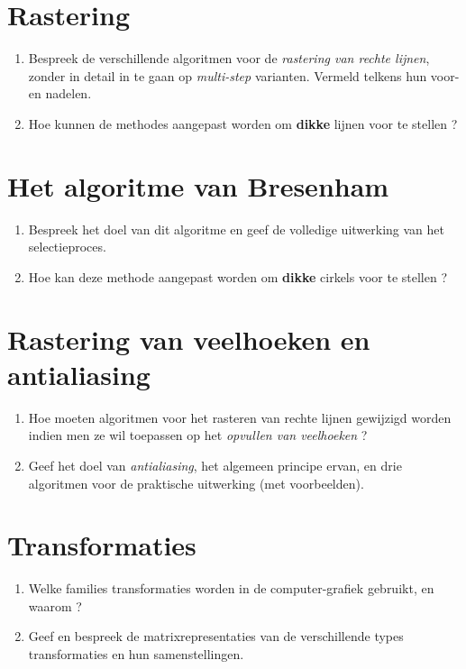 \documentclass{report}
\begin{document}
	\section{Rastering}
	\begin{enumerate}
		\item Bespreek de verschillende algoritmen voor de \textit{rastering van rechte lijnen}, zonder in detail in te gaan op \textit{multi-step} varianten. Vermeld telkens hun voor- en nadelen. 
		
		\item Hoe kunnen de methodes aangepast worden om \textbf{dikke} lijnen voor te stellen ? 
	\end{enumerate}

	\section{Het algoritme van Bresenham}
	\begin{enumerate}
		\item Bespreek het doel van dit algoritme en geef de volledige uitwerking van het selectieproces. 
		
		\item Hoe kan deze methode aangepast worden om \textbf{dikke} cirkels voor te stellen ? 
	\end{enumerate}

	\section{Rastering van veelhoeken en antialiasing}
	\begin{enumerate}
		\item Hoe moeten algoritmen voor het rasteren van rechte lijnen gewijzigd worden indien men ze wil toepassen op het \textit{opvullen van veelhoeken} ? 
		
		\item Geef het doel van \textit{antialiasing}, het algemeen principe ervan, en drie algoritmen voor de praktische uitwerking (met voorbeelden). 
	\end{enumerate}

	\section{Transformaties}
	\begin{enumerate}
	\item Welke families transformaties worden in de computer-grafiek gebruikt, en waarom ?
	
	\item Geef en bespreek de matrixrepresentaties van de verschillende types transformaties en hun samenstellingen. 
	\end{enumerate}
\end{document}
